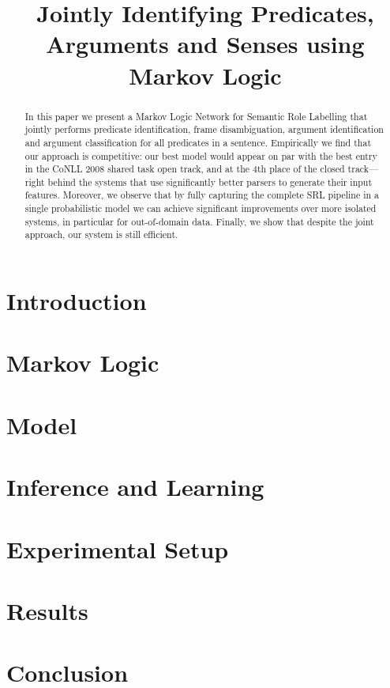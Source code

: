 \documentclass[11pt]{article}
\title{Jointly Identifying Predicates, Arguments and Senses using Markov Logic}
\author{}
\date{}
\begin{document}



\maketitle
\begin{abstract}
In this paper we present a Markov Logic Network for Semantic Role
Labelling that jointly performs predicate identification, frame
disambiguation, argument identification and argument classification
for all predicates in a sentence. Empirically we find that our
approach is competitive: our best model would appear on par
with the best entry in the CoNLL 2008 shared task open track, and at
the 4th place of the closed track---right behind the systems that use
significantly better parsers to generate their input features.
Moreover, we observe
that by fully capturing the complete SRL pipeline in a single
probabilistic model we can achieve significant improvements over more isolated systems, in particular for out-of-domain
data. Finally, we show that despite the joint approach, our
system is still efficient. 
\end{abstract} 


\section{Introduction}




\section{Markov Logic} \label{sec:markovlogic}



\section{Model} \label{sec:model} 



\section{Inference and Learning}\label{sec:inference}




\section{Experimental Setup}
\label{sec:experiments}


\section{Results}\label{sec:results}



\section{Conclusion} \label{sec:conclusion}





\end{document}
